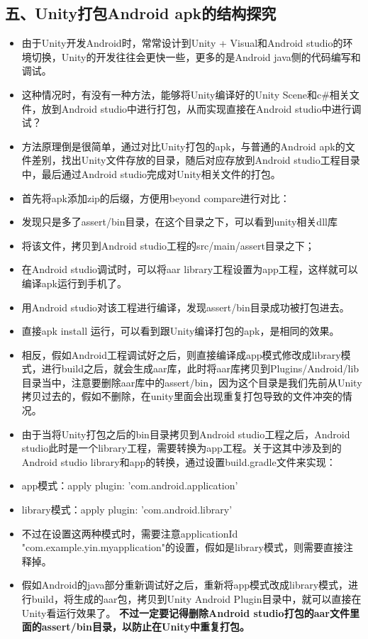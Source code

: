 \documentclass[9pt, b5paper]{article}
\begin{document}
\subsection{五、Unity打包Android apk的结构探究}
\label{sec-2-5}
\begin{itemize}
\item 由于Unity开发Android时，常常设计到Unity + Visual和Android studio的环境切换，Unity的开发往往会更快一些，更多的是Android java侧的代码编写和调试。
\item 这种情况时，有没有一种方法，能够将Unity编译好的Unity Scene和c\#相关文件，放到Android studio中进行打包，从而实现直接在Android studio中进行调试？
\item 方法原理倒是很简单，通过对比Unity打包的apk，与普通的Android apk的文件差别，找出Unity文件存放的目录，随后对应存放到Android studio工程目录中，最后通过Android studio完成对Unity相关文件的打包。
\item 首先将apk添加zip的后缀，方便用beyond compare进行对比：
\item 发现只是多了assert/bin目录，在这个目录之下，可以看到unity相关dll库
\item 将该文件，拷贝到Android studio工程的src/main/assert目录之下；
\item 在Android studio调试时，可以将aar library工程设置为app工程，这样就可以编译apk运行到手机了。
\item 用Android studio对该工程进行编译，发现assert/bin目录成功被打包进去。
\item 直接apk install 运行，可以看到跟Unity编译打包的apk，是相同的效果。
\item 相反，假如Android工程调试好之后，则直接编译成app模式修改成library模式，进行build之后，就会生成aar库，此时将aar库拷贝到Plugins/Android/lib目录当中，注意要删除aar库中的assert/bin，因为这个目录是我们先前从Unity拷贝过去的，假如不删除，在unity里面会出现重复打包导致的文件冲突的情况。
\item 由于当将Unity打包之后的bin目录拷贝到Android studio工程之后，Android studio此时是一个library工程，需要转换为app工程。关于这其中涉及到的Android studio library和app的转换，通过设置build.gradle文件来实现：
\item app模式：apply plugin: 'com.android.application'
\item library模式：apply plugin:   'com.android.library'
\item 不过在设置这两种模式时，需要注意applicationId "com.example.yin.myapplication"的设置，假如是library模式，则需要直接注释掉。
\item 假如Android的java部分重新调试好之后，重新将app模式改成library模式，进行build，将生成的aar包，拷贝到Unity Android Plugin目录中，就可以直接在Unity看运行效果了。 \textbf{不过一定要记得删除Android studio打包的aar文件里面的assert/bin目录，以防止在Unity中重复打包。}
\end{itemize}
\end{document}
